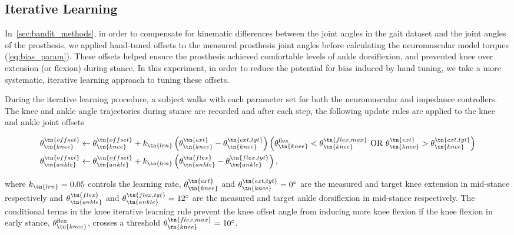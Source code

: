 \subsection{Iterative Learning}\label{sec:treadmill_exp_iterative_learning}
In~\cref{sec:bandit_methods}, in order to compensate for kinematic differences
between the joint angles in the gait dataset and the joint angles of the
prosthesis, we applied hand-tuned offsets to the measured prosthesis joint
angles before calculating the neuromuscular model torques
(\cref{eq:bias_param}). These offsets helped ensure the prosthesis achieved
comfortable levels of ankle dorsiflexion, and prevented knee over extension (or
flexion) during stance. In this experiment, in order to reduce the potential for
bias induced by hand tuning, we take a more systematic, iterative learning
approach to tuning these offsets.

During the iterative learning procedure, a subject walks with each parameter set
for both the neuromuscular and impedance controllers. The knee and ankle angle
trajectories during stance are recorded and after each step, the following
update rules are applied to the knee and ankle joint offsets
\begin{fullwidth}
\begin{align}
    \theta_\tn{knee}^\tn{offset} &\leftarrow \theta_\tn{knee}^\tn{offset} +
    k_\tn{lrn} \left(\theta_\tn{knee}^\tn{ext} - \theta_\tn{knee}^\tn{ext,tgt} \right)
    \left(\theta_\tn{knee}^\textrm{flex} < \theta_\tn{knee}^\tn{flex,max}
    \textrm{~OR~} \theta_\tn{knee}^\tn{ext} > \theta_\tn{knee}^\tn{ext,tgt}\right)\\
    \theta_\tn{ankle}^\tn{offset} &\leftarrow \theta_\tn{ankle}^\tn{offset} +
    k_\tn{lrn} \left(\theta_\tn{ankle}^\tn{flex} - \theta_\tn{ankle}^\tn{flex,tgt} \right),
\end{align}
\end{fullwidth}
where $k_\tn{lrn} = 0.05$ controls the learning rate,
$\theta_\tn{knee}^\tn{ext}$ and $\theta_\tn{knee}^\tn{ext,tgt} = 0^\circ$ are
the measured and target knee extension in mid-stance respectively and
$\theta_\tn{ankle}^\tn{flex}$ and $\theta_\tn{ankle}^\tn{flex,tgt} = 12^\circ$
are the measured and target ankle dorsiflexion in mid-stance respectively. The
conditional terms in the knee iterative learning rule prevent the knee offset
angle from inducing more knee flexion if the knee flexion in early stance,
$\theta_\tn{knee}^\textrm{flex}$, crosses a threshold
$\theta_\tn{knee}^\tn{flex,max} = 10^\circ$.

